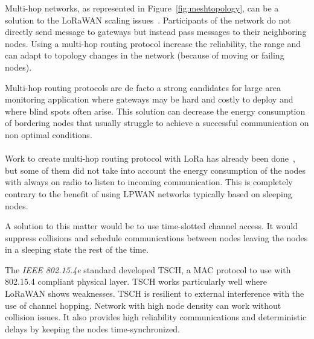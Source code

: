 


Multi-hop networks, as represented in Figure~\ref{fig:meshtopology}, can be a solution to
the LoRaWAN scaling issues~\cite{8115756}.
Participants of the network do not directly send message to gateways but instead pass
messages to their neighboring nodes.
Using a multi-hop routing protocol increase the reliability, the range
and can adapt to topology changes in the network (because of moving or failing nodes).

Multi-hop routing protocols are de facto a strong candidates for large area monitoring 
application where gateways may be hard and costly to deploy and where blind
spots often arise.
This solution can decrease the energy consumption of bordering nodes that
usually struggle to achieve a successful communication on non optimal
conditions.

\paragraph{}

Work to create multi-hop routing protocol with LoRa has already been
done~\cite{8115756, DIAS2018424, 8856256, Abrardo_2019, duong2018}, 
but some of them did not take into account the energy consumption of the nodes
with always on radio to listen to incoming communication.
This is completely contrary to the benefit of using LPWAN networks typically
based on sleeping nodes.

A solution to this matter would be to use time-slotted channel access.
It would suppress collisions and schedule communications between nodes leaving
the nodes in a sleeping state the rest of the time.

The \emph{IEEE 802.15.4e} standard developed TSCH, a MAC
protocol to use with 802.15.4 compliant physical layer.
TSCH works particularly well where LoRaWAN shows weaknesses. 
TSCH is resilient to external interference with the use of channel hopping.
Network with high node density can work without collision issues.
It also provides high reliability communications and deterministic delays by 
keeping the nodes time-synchronized.

